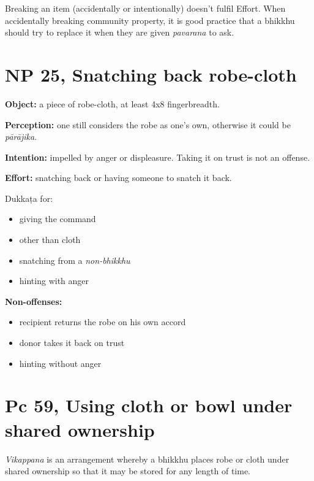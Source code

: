 Breaking an item (accidentally or intentionally) doesn't fulfil Effort.
When accidentally breaking community property, it is good practice that
a bhikkhu should try to replace it when they are given \emph{pavarana}
to ask.

\section{NP 25, Snatching back robe-cloth}

\textbf{Object:} a piece of robe-cloth, at least 4x8 fingerbreadth.

\textbf{Perception:} one still considers the robe as one's own,
otherwise it could be \emph{pārājika}.

\textbf{Intention:} impelled by anger or displeasure. Taking it on trust
is not an offense.

\textbf{Effort:} snatching back or having someone to snatch it back.

\begin{multicols}{2}

Dukkaṭa for:

\begin{itemize}
\tightlist
\item
  giving the command
\item
  other than cloth
\item
  snatching from a \emph{non-bhikkhu}
\item
  hinting with anger
\end{itemize}

\columnbreak

\textbf{Non-offenses:}

\begin{itemize}
\tightlist
\item
  recipient returns the robe on his own accord
\item
  donor takes it back on trust
\item
  hinting without anger
\end{itemize}

\end{multicols}

\section{Pc 59, Using cloth or bowl under shared ownership}

\enlargethispage*{\baselineskip}

\emph{Vikappana} is an arrangement whereby a bhikkhu places robe or
cloth under shared ownership so that it may be stored for any length of
time.

